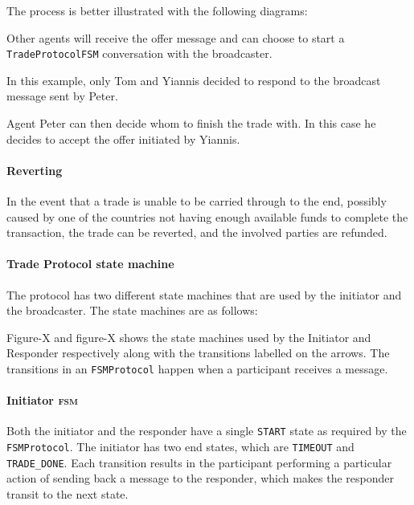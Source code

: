 The process is better illustrated with the following diagrams:

%
%

Other agents will receive the offer message and can choose to start a \texttt{TradeProtocolFSM} conversation with the broadcaster.

%
%

In this example, only Tom and Yiannis decided to respond to the broadcast message sent by Peter.

%
%

Agent Peter can then decide whom to finish the trade with. In this case he decides to accept the offer initiated by Yiannis.

\paragraph{Reverting}

In the event that a trade is unable to be carried through to the end, possibly caused by one of the countries not having enough available funds to complete the transaction, the trade can be reverted, and the involved parties are refunded.

\paragraph{Trade Protocol state machine}

The protocol has two different state machines that are used by the initiator and the broadcaster. The state machines are as follows: 

%
%

%
%

Figure-X and figure-X shows the state machines used by the Initiator and Responder respectively along with the transitions labelled on the arrows. The transitions in an \texttt{FSMProtocol} happen when a participant receives a message.

\paragraph{Initiator \textsc{fsm}}

Both the initiator and the responder have a single \texttt{START} state as required by the \texttt{FSMProtocol}. The initiator has two end states, which are \texttt{TIMEOUT} and \texttt{TRADE\_DONE}. Each transition results in the participant performing a particular action of sending back a message to the responder, which makes the responder transit to the next state.

